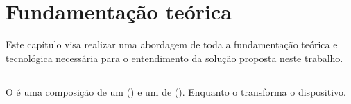 \chapter{Fundamentação teórica} \label{chap:fundamentacao}

Este capítulo visa realizar uma abordagem de toda a fundamentação teórica e tecnológica necessária para o entendimento da solução proposta neste trabalho.

\section{\mhubcddl}

O \mhubcddl é uma composição de um \gateway (\mhub) e um \middleware de \iomt (\cddl). Enquanto o \mhub transforma o dispositivo.

